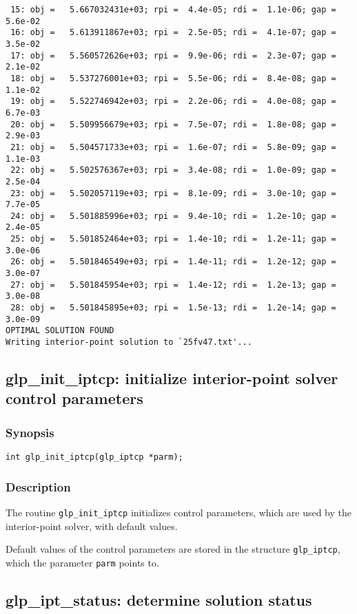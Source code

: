 \begin{footnotesize}
\begin{verbatim}
 15: obj =   5.667032431e+03; rpi =  4.4e-05; rdi =  1.1e-06; gap =  5.6e-02
 16: obj =   5.613911867e+03; rpi =  2.5e-05; rdi =  4.1e-07; gap =  3.5e-02
 17: obj =   5.560572626e+03; rpi =  9.9e-06; rdi =  2.3e-07; gap =  2.1e-02
 18: obj =   5.537276001e+03; rpi =  5.5e-06; rdi =  8.4e-08; gap =  1.1e-02
 19: obj =   5.522746942e+03; rpi =  2.2e-06; rdi =  4.0e-08; gap =  6.7e-03
 20: obj =   5.509956679e+03; rpi =  7.5e-07; rdi =  1.8e-08; gap =  2.9e-03
 21: obj =   5.504571733e+03; rpi =  1.6e-07; rdi =  5.8e-09; gap =  1.1e-03
 22: obj =   5.502576367e+03; rpi =  3.4e-08; rdi =  1.0e-09; gap =  2.5e-04
 23: obj =   5.502057119e+03; rpi =  8.1e-09; rdi =  3.0e-10; gap =  7.7e-05
 24: obj =   5.501885996e+03; rpi =  9.4e-10; rdi =  1.2e-10; gap =  2.4e-05
 25: obj =   5.501852464e+03; rpi =  1.4e-10; rdi =  1.2e-11; gap =  3.0e-06
 26: obj =   5.501846549e+03; rpi =  1.4e-11; rdi =  1.2e-12; gap =  3.0e-07
 27: obj =   5.501845954e+03; rpi =  1.4e-12; rdi =  1.2e-13; gap =  3.0e-08
 28: obj =   5.501845895e+03; rpi =  1.5e-13; rdi =  1.2e-14; gap =  3.0e-09
OPTIMAL SOLUTION FOUND
Writing interior-point solution to `25fv47.txt'...
\end{verbatim}
\end{footnotesize}

\subsection{glp\_init\_iptcp: initialize interior-point solver control
parameters}

\subsubsection*{Synopsis}

\begin{verbatim}
int glp_init_iptcp(glp_iptcp *parm);
\end{verbatim}

\subsubsection*{Description}

The routine \verb|glp_init_iptcp| initializes control parameters, which
are used by the interior-point solver, with default values.

Default values of the control parameters are stored in the structure
\verb|glp_iptcp|, which the parameter \verb|parm| points to.

\subsection{glp\_ipt\_status: determine solution status}

